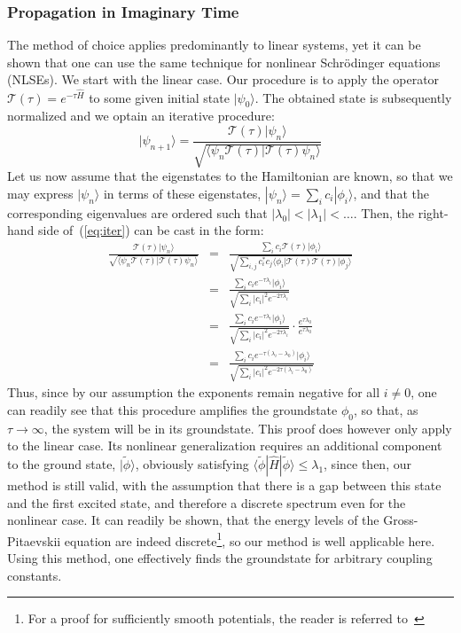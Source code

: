 \subsubsection{Propagation in Imaginary Time}
The method of choice applies predominantly to linear systems, yet it can be shown that one can use the same technique for nonlinear
Schr\"odinger equations (NLSEs). We start with the linear case. Our procedure is to apply the operator
$\mathcal{T}(\tau)=e^{-\tau\hat{H}}$ to some given initial state $|\psi_0\rangle$. The obtained state is subsequently normalized and we
optain an iterative procedure:
	\begin{equation}\label{eq:iter}
		|\psi_{n+1}\rangle =
		\frac{\mathcal{T}(\tau)|\psi_n\rangle}{\sqrt{\langle\psi_n\mathcal{T}(\tau)|\mathcal{T}(\tau)\psi_n\rangle}}
	\end{equation}
Let us now assume that the eigenstates to the Hamiltonian are known, so that we may express $|\psi_n\rangle$ in terms of these
eigenstates, $|\psi_n\rangle=\sum_ic_i|\phi_i\rangle$, and that the corresponding eigenvalues are ordered such that
$|\lambda_0|<|\lambda_1|<\ldots$. Then, the right-hand side of~(\ref{eq:iter}) can be cast in the form:
	\begin{eqnarray}
		\frac{\mathcal{T}(\tau)|\psi_n\rangle}{\sqrt{\langle\psi_n\mathcal{T}(\tau)|\mathcal{T}(\tau)\psi_n\rangle}}
		&=&\frac{\sum_ic_i\mathcal{T}(\tau)|\phi_i\rangle}{\sqrt{\sum_{i,
		j}c_i^*c_j\langle\phi_i|\mathcal{T}(\tau)\mathcal{T}(\tau)|\phi_j\rangle}}\nonumber\\
		{}&=&\frac{\sum_ic_ie^{-\tau\lambda_i}|\phi_i\rangle}{\sqrt{\sum_{i}|c_i|^2e^{-2\tau\lambda_i}}}\nonumber\\		
		{}&=&\frac{\sum_ic_ie^{-\tau\lambda_i}|\phi_i\rangle}{\sqrt{\sum_{i}|c_i|^2e^{-2\tau\lambda_i}}}\cdot\frac{e^{\tau\lambda_0}}{e^{\tau\lambda_0}}\nonumber\\
		{}&=&\frac{\sum_ic_ie^{-\tau(\lambda_i-\lambda_0)}|\phi_i\rangle}{\sqrt{\sum_{i}|c_i|^2e^{-2\tau(\lambda_i-\lambda_0)}}}\nonumber
	\end{eqnarray}
Thus, since by our assumption the exponents remain negative for all $i\neq 0$, one can readily see that this procedure amplifies
the groundstate $\phi_0$, so that, as $\tau\rightarrow\infty$, the system will be in its groundstate. This proof does however
only apply to the linear case. Its nonlinear generalization requires an additional component to the ground state, 
$|\tilde{\phi}\rangle$, obviously satisfying $\langle\tilde{\phi}|\hat{H}|\tilde{\phi}\rangle\leq\lambda_1$, since then, our method is still valid, with the assumption that there is a gap between this state and the first excited state, and therefore a discrete spectrum even for the nonlinear case. It can readily be shown, that the energy levels of the Gross-Pitaevskii equation are indeed discrete\footnote{For a proof for sufficiently smooth potentials, the reader is referred to~\cite{konotop}}, so our method is well applicable here. Using this method, one
effectively finds the groundstate for arbitrary coupling constants.
	
